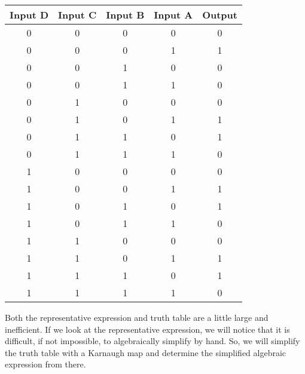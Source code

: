 \begin{example}
        \begin{center}
            \begin{tabular}{c c c c | c}
                \toprule
                Input D & Input C & Input B & Input A & Output \\
                \midrule
                    0    &    0     &    0     &    0     &    0    \\
                    0    &    0     &    0     &    1     &    1    \\
                    0    &    0     &    1     &    0     &    0    \\
                    0    &    0     &    1     &    1     &    0    \\
                    0    &    1     &    0     &    0     &    0    \\
                    0    &    1     &    0     &    1     &    1    \\
                    0    &    1     &    1     &    0     &    1    \\
                    0    &    1     &    1     &    1     &    0    \\
                    1    &    0     &    0     &    0     &    0    \\
                    1    &    0     &    0     &    1     &    1    \\
                    1    &    0     &    1     &    0     &    1    \\
                    1    &    0     &    1     &    1     &    0    \\
                    1    &    1     &    0     &    0     &    0    \\
                    1    &    1     &    0     &    1     &    1    \\
                    1    &    1     &    1     &    0     &    1    \\
                    1    &    1     &    1     &    1     &    0    \\
                \bottomrule
            \end{tabular}
        \end{center}

        Both the representative expression and truth table are a little large and inefficient.
        If we look at the representative expression, we will notice that it is difficult, if not impossible, to algebraically simplify by hand. 
        So, we will simplify the truth table with a Karnaugh map and determine the simplified algebraic expression from there.
        

\end{example}
